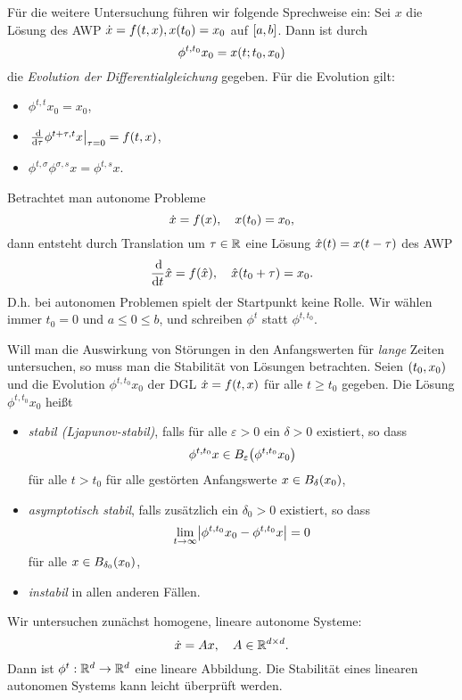 \documentclass{lecture}
\begin{document}
	Für die weitere Untersuchung führen wir folgende Sprechweise ein:
	Sei \(x\) die Lösung des AWP \(\dot{x} = f\parentheses*{t, x}, x\parentheses*{t_0} = x_0\) auf \(\brackets*{a, b}\).
	Dann ist durch
	\[
		\phi^{t, t_0}x_0 = x\parentheses*{t; t_0, x_0}
	\]
	die \emph{Evolution der Differentialgleichung} gegeben.
	Für die Evolution gilt:
	\begin{itemize}
		\item \(\phi^{t, t}x_0 = x_0\),
		\item \(\left.\frac{\d}{\d\tau}\phi^{t + \tau, t}x\right|_{\tau = 0} = f\parentheses*{t, x}\),
		\item \(\phi^{t, \sigma}\phi^{\sigma, s}x = \phi^{t, s}x\).
	\end{itemize}

	\begin{remark}
		Betrachtet man autonome Probleme
		\[
			\dot{x} = f\parentheses*{x}, \quad x\parentheses*{t_0} = x_0,
		\]
		dann entsteht durch Translation um \(\tau \in \R\) eine Lösung \(\hat{x}\parentheses*{t} = x\parentheses*{t - \tau}\) des AWP
		\[
			\frac{\d}{\d t}\hat{x} = f\parentheses*{\hat{x}}, \quad \hat{x}\parentheses*{t_0 + \tau} = x_0.
		\]
		D.h. bei autonomen Problemen spielt der Startpunkt keine Rolle.
		Wir wählen immer \(t_0 = 0\) und \(a \le 0 \le b\), und schreiben \(\phi^t\) statt \(\phi^{t, t_0}\).
	\end{remark}

	Will man die Auswirkung von Störungen in den Anfangswerten für \emph{lange} Zeiten untersuchen, so muss man die Stabilität von Lösungen betrachten.
	Seien \(\parentheses*{t_0, x_0}\) und die Evolution \(\phi^{t, t_0}x_0\) der DGL \(\dot{x} = f\parentheses*{t, x}\) für alle \(t \ge t_0\) gegeben.
	Die Lösung \(\phi^{t, t_0}x_0\) heißt
	\begin{itemize}
		\item \emph{stabil (Ljapunov-stabil)}, falls für alle \(\varepsilon > 0\) ein \(\delta > 0\) existiert, so dass
		\[
			\phi^{t, t_0}x \in B_\varepsilon\parentheses*{\phi^{t, t_0}x_0}
		\]
		für alle \(t > t_0\) für alle gestörten Anfangswerte \(x \in B_\delta\parentheses*{x_0}\),
		\item \emph{asymptotisch stabil}, falls zusätzlich ein \(\delta_0 > 0\) existiert, so dass
		\[
			\lim_{t \to \infty}\absolute*{\phi^{t, t_0}x_0 - \phi^{t, t_0}x} = 0
		\]
		für alle \(x \in B_{\delta_0}\parentheses*{x_0}\),
		\item \emph{instabil} in allen anderen Fällen.
	\end{itemize}
	Wir untersuchen zunächst homogene, lineare autonome Systeme:
	\[
		\dot{x} = Ax, \quad A \in \R^{d \times d}.
	\]
	Dann ist \(\phi^t: \R^d \to \R^d\) eine lineare Abbildung.
	Die Stabilität eines linearen autonomen Systems kann leicht überprüft werden.
\end{document}
